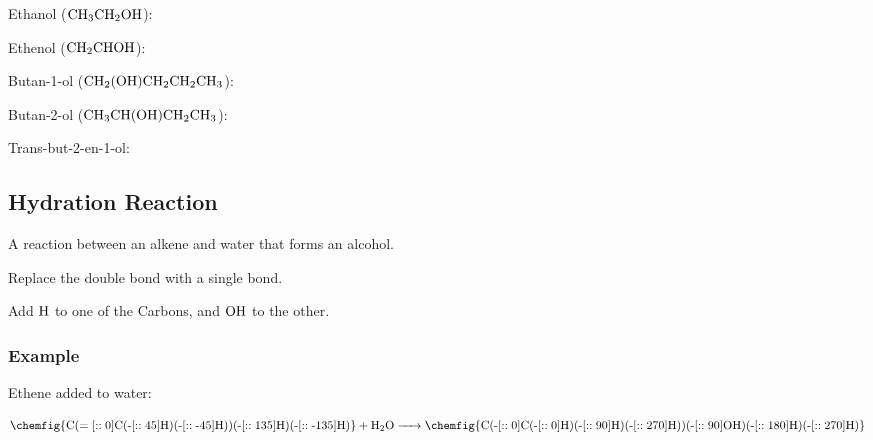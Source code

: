 \documentclass[a4paper,11pt]{article}
\begin{document}
Ethanol ($\ce{CH3CH2OH}$):

\begin{center}
\end{center}

Ethenol ($\ce{CH2CHOH}$):

\begin{center}
\end{center}

Butan-1-ol ($\ce{CH2(OH)CH2CH2CH3}$):

\begin{center}
\end{center}

Butan-2-ol ($\ce{CH3CH(OH)CH2CH3}$):

\begin{center}
\end{center}

Trans-but-2-en-1-ol:

\begin{center}
\end{center}


\subsection{Hydration Reaction}

A reaction between an alkene and water that forms an alcohol.

Replace the double bond with a single bond.

Add $\ce{H}$ to one of the Carbons, and $\ce{OH}$ to the other.


\subsubsection{Example}

Ethene added to water:

$$
\ce{\chemfig{C(=[::0]C(-[::45]H)(-[::-45]H))(-[::135]H)(-[::-135]H)} + H2O ->
\chemfig{C(-[::0]C(-[::0]H)(-[::90]H)(-[::270]H))(-[::90]OH)(-[::180]H)(-[::270]H)}}
$$
\end{document}
